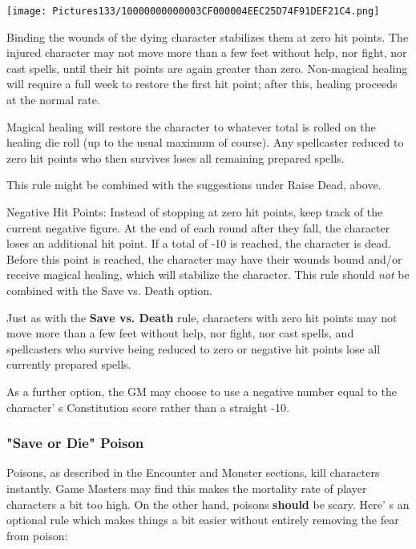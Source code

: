 \documentclass[a4paper,twoside,openany,10pt]{book}
\begin{document}
\begin{multicols}{2}
\begin{center}
	\texttt{[image: Pictures133/10000000000003CF000004EEC25D74F91DEF21C4.png]}
\end{center}

Binding the wounds of the dying character stabilizes them at zero hit points. The injured character may not move more than a few feet without help, nor fight, nor cast spells, until their hit points are again greater than zero. Non-magical healing will require a full week to restore the first hit point; after this, healing proceeds at the normal rate.

Magical healing will restore the character to whatever total is rolled on the healing die roll (up to the usual maximum of course).  Any spellcaster reduced to zero hit points who then survives loses all remaining prepared spells.

This rule might be combined with the suggestions under Raise Dead, above.

Negative Hit Points: Instead of stopping at zero hit points, keep track of the current negative figure. At the end of each round after they fall, the character loses an additional hit point. If a total of -10 is  reached, the character is dead. Before this point is reached, the character may have their wounds bound and/or receive magical healing, which will stabilize the character. This rule should \emph{not} be combined with the Save vs. Death option.

Just as with the \textbf{Save vs. Death} rule, characters with zero hit points may not move more than a few feet without help, nor fight, nor cast spells, and spellcasters who survive being reduced to zero or negative hit points lose all currently prepared spells.

As a further option, the GM may choose to use a negative number equal to the character' s Constitution score rather than a straight -10.

\subsubsection{"Save or Die" Poison}\label{save-or-die-poison}

Poisons, as described in the Encounter and Monster sections, kill characters instantly. Game Masters may find this makes the mortality rate of player characters a bit too high. On the other hand, poisons \textbf{should} be scary. Here' s an optional rule which makes things a bit easier without entirely removing the fear from poison:


\end{multicols}
\end{document}
